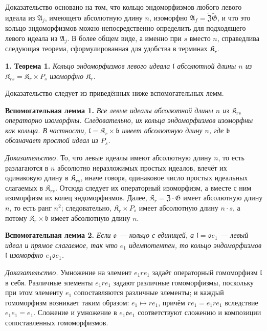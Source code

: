 \documentclass[11pt]{article}
\begin{document}
Доказательство основано на том, что кольцо эндоморфизмов любого левого идеала из \(\mathfrak A_j\), имеющего абсолютную длину \(n\), изоморфно \(\mathfrak A_f=\widetilde{\mathfrak Z}\widetilde{\mathfrak G}\), и что это кольцо эндоморфизмов можно непосредственно определить для подходящего левого идеала из \(\mathfrak A_j\). В более общем виде, а именно при \(s\) вместо \(n\), справедлива следующая теорема, сформулированная для удобства в терминах \(\mathfrak K_r\).

\noindent\textbf{1. Теорема 1.} \emph{Кольцо эндоморфизмов левого идеала \(\mathfrak l\) абсолютной длины \(n\) из \(\mathfrak K_{rs}=\mathfrak K_r\times P_s\) изоморфно \(\mathfrak K_r\).}

Доказательство следует из приведённых ниже вспомогательных лемм.

\noindent\textbf{Вспомогательная лемма 1.} \emph{Все левые идеалы абсолютной длины \(n\) из \(\mathfrak K_{rs}\) операторно изоморфны. Следовательно, их кольца эндоморфизмов изоморфны как кольца. В частности, \(\mathfrak l=\mathfrak K_r\times\mathfrak b\) имеет абсолютную длину \(n\), где \(\mathfrak b\) обозначает простой идеал из \(P_s\).}

\noindent\emph{Доказательство.} То, что левые идеалы имеют абсолютную длину \(n\), то есть разлагаются в \(n\) абсолютно неразложимых простых идеалов, влечёт их одинаковую длину в \(\mathfrak K_{rs}\), иначе говоря, одинаковое число простых идеальных слагаемых в \(\mathfrak K_{rs}\). Отсюда следует их операторный изоморфизм, а вместе с ним изоморфизм их колец эндоморфизмов. Далее, \(\mathfrak K_r=\mathfrak Z\cdot\mathfrak G\) имеет абсолютную длину \(n\), то есть ранг \(n^2\); следовательно, \(\mathfrak K_r\times P_s\) имеет абсолютную длину \(n\cdot s\), а потому \(\mathfrak K_r\times\mathfrak b\) имеет абсолютную длину \(n\).

\noindent\textbf{Вспомогательная лемма 2.} \emph{Если \(\mathfrak o\) --- кольцо с единицей, а \(\mathfrak l=\mathfrak o e_1\) --- левый идеал и прямое слагаемое, так что \(e_1\) идемпотентен, то кольцо эндоморфизмов \(\mathfrak l\) изоморфно \(e_1\mathfrak o e_1\).}

\noindent\emph{Доказательство.} Умножение на элемент \(e_1re_1\) задаёт операторный гомоморфизм \(\mathfrak l\) в себя. Различные элементы \(e_1re_1\) задают различные гомоморфизмы, поскольку при этом элементу \(e_1\) сопоставляются различные элементы; и каждый гомоморфизм возникает таким образом: \(e_1\mapsto re_1\), причём \(re_1=e_1re_1\) вследствие \(e_1e_1=e_1\). Сложение и умножение в \(e_1\mathfrak o e_1\) соответствуют сложению и композиции сопоставленных гомоморфизмов.
\end{document}
